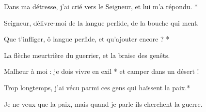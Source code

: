 \item Dans ma détresse, j'ai crié vers le Seigneur, et lui m'a répondu. *

\item Seigneur, délivre-moi de la langue perfide, de la bouche qui ment.

\item Que t'infliger, ô langue perfide, et qu'ajouter encore ? *

\item La flèche meurtrière du guerrier, et la braise des genêts.

\item Malheur à moi : je dois vivre en exil * et camper dans un désert !

\item Trop longtemps, j'ai vécu parmi ces gens qui haïssent la paix.*

\item Je ne veux que la paix, mais quand je parle ils cherchent la guerre.

